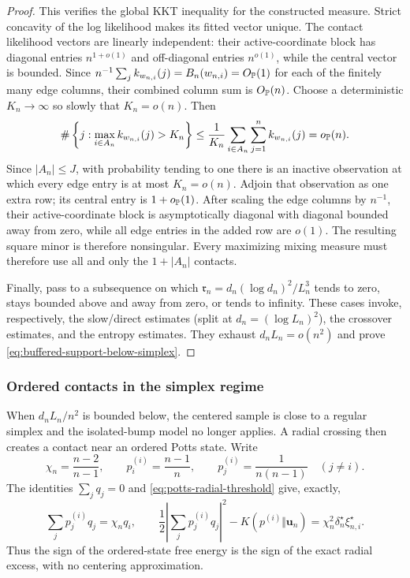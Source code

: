 \begin{proof}
This verifies the global KKT inequality for the constructed measure. Strict
concavity of the log likelihood makes its fitted vector unique. The contact likelihood
vectors are linearly independent: their active-coordinate block has
diagonal entries \(n^{1+o(1)}\) and off-diagonal entries \(n^{o(1)}\),
while the central vector is bounded.  Since
 \(n^{-1}\sum_jk_{w_{n,i}}(j)=B_n(w_{n,i})=O_{\mathbb P}(1)\) for each of the
finitely many edge columns, their combined column sum is \(O_{\mathbb P}(n)\).
Choose a deterministic \(K_n\to\infty\) so slowly that \(K_n=o(n)\).
Then
\[
 \#\left\{j:\max_{i\in A_n}k_{w_{n,i}}(j)>K_n\right\}
 \le
 \frac1{K_n}\sum_{i\in A_n}\sum_{j=1}^n k_{w_{n,i}}(j)
 =o_{\mathbb P}(n).
\]
Since \(|A_n|\le J\), with probability tending to one there is an inactive
observation at which every edge entry is at most \(K_n=o(n)\).  Adjoin that
observation as one extra row; its central entry is
\(1+o_{\mathbb P}(1)\).  After scaling the edge columns by \(n^{-1}\), their
active-coordinate block is asymptotically diagonal with diagonal bounded
away from zero, while all edge entries in the added row are \(o(1)\).
The resulting square minor is therefore nonsingular.  Every
maximizing mixing measure must therefore use all and only the
\(1+|A_n|\) contacts.

Finally, pass to a subsequence on which
\(\mathfrak r_n=d_n(\log d_n)^2/L_n^3\) tends to zero, stays bounded above
and away from zero, or tends to infinity.  These cases invoke,
respectively, the slow/direct estimates (split at
\(d_n=(\log L_n)^2\)), the crossover estimates, and the entropy estimates.
They exhaust \(d_nL_n=o(n^2)\) and prove
\eqref{eq:buffered-support-below-simplex}.
\end{proof}

\subsubsection{Ordered contacts in the simplex regime}

When \(d_nL_n/n^2\) is bounded below, the centered sample is close to a
regular simplex and the isolated-bump model no longer applies.  A radial
crossing then creates a contact near an ordered Potts state.  Write
\[
 \chi_n=\frac{n-2}{n-1},
 \qquad
 p_i^{(i)}=\frac{n-1}{n},
 \qquad
 p_j^{(i)}=\frac1{n(n-1)}\quad(j\ne i).
\]
The identities \(\sum_jq_j=0\) and
\eqref{eq:potts-radial-threshold} give, exactly,
\begin{equation}
\label{eq:ordered-potts-excess}
 \sum_jp_j^{(i)}q_j=\chi_nq_i,
 \qquad
 \frac12\left|\sum_jp_j^{(i)}q_j\right|^2
 -K(p^{(i)}\Vert \mathbf u_n)
 =\chi_n^2\delta_n^\star \xi_{n,i}^\star.
\end{equation}
Thus the sign of the ordered-state free energy is the sign of the exact
radial excess, with no centering approximation.


